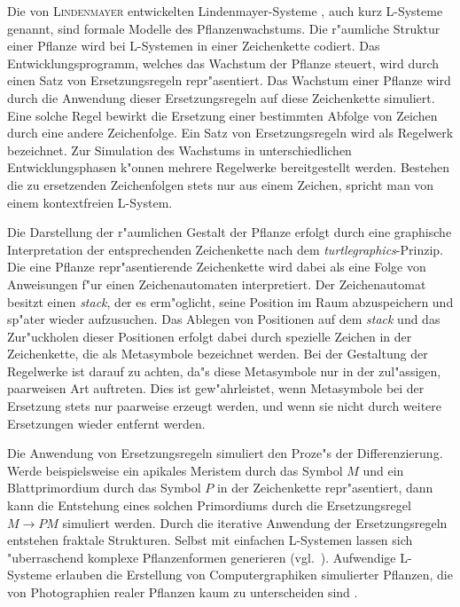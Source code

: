 Die von \textsc{Lindenmayer} entwickelten
Lindenmayer-Systeme \cite{Prusinkiewicz90,Prusinkiewicz94,RozenbergSalomaa86}, auch kurz L-Systeme genannt, sind formale Modelle
des Pflanzenwachstums. Die r"aumliche Struktur einer Pflanze wird bei L-Systemen in einer Zeichenkette codiert.
Das Entwicklungsprogramm, welches das Wachstum der Pflanze steuert, wird durch einen Satz von Ersetzungsregeln
repr"asentiert.
Das Wachstum einer Pflanze wird durch die Anwendung dieser Ersetzungsregeln auf diese Zeichenkette simuliert.
Eine solche Regel bewirkt die Ersetzung einer bestimmten Abfolge von Zeichen durch eine andere Zeichenfolge.
Ein Satz von Ersetzungsregeln wird als Regelwerk bezeichnet. Zur Simulation des Wachstums in unterschiedlichen
Entwicklungsphasen k"onnen mehrere Regelwerke bereitgestellt werden. Bestehen die zu ersetzenden Zeichenfolgen
stets nur aus einem Zeichen, spricht man von einem kontextfreien L-System.

Die Darstellung der r"aumlichen Gestalt der Pflanze erfolgt durch eine graphische Interpretation der entsprechenden
Zeichenkette nach dem \textsl{turtlegraphics}-Prinzip. Die eine Pflanze repr"asentierende Zeichenkette wird dabei
als eine Folge von Anweisungen f"ur einen Zeichenautomaten interpretiert.
Der Zeichenautomat besitzt einen \textsl{stack}, der es erm"oglicht, seine Position im Raum abzuspeichern und sp"ater
wieder aufzusuchen. Das Ablegen von Positionen auf dem \textsl{stack} und das Zur"uckholen dieser Positionen
erfolgt dabei durch spezielle Zeichen in der Zeichenkette, die als Metasymbole bezeichnet werden. Bei der Gestaltung
der Regelwerke ist darauf zu achten, da"s diese Metasymbole nur in der zul"assigen, paarweisen Art auftreten.
Dies ist gew"ahrleistet, wenn Metasymbole bei der Ersetzung stets nur paarweise erzeugt werden, und wenn sie nicht
durch weitere Ersetzungen wieder entfernt werden.

Die Anwendung von Ersetzungsregeln simuliert den Proze"s der Differenzierung. Werde beispielsweise ein apikales
Meristem durch das Symbol $M$ und ein Blattprimordium durch das Symbol $P$ in der Zeichenkette repr"asentiert,
dann kann die Entstehung eines solchen Primordiums durch die Ersetzungsregel $M \rightarrow PM$
simuliert werden. Durch die iterative Anwendung der Ersetzungsregeln entstehen
fraktale Strukturen. Selbst mit einfachen L-Systemen lassen sich "uberraschend komplexe Pflanzenformen
generieren (vgl.\ \cite{Tragut89}). Aufwendige L-Systeme erlauben die Erstellung von Computergraphiken simulierter
Pflanzen, die von Photographien realer Pflanzen kaum zu unterscheiden sind \cite{Prusinkiewicz90}.


